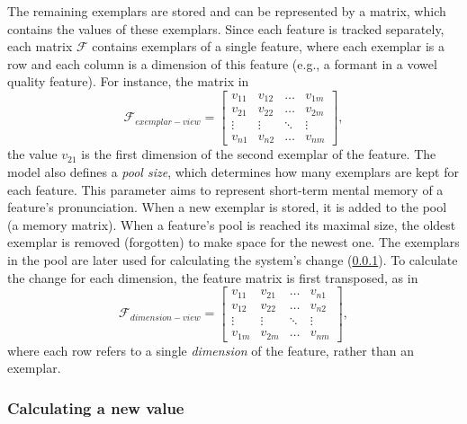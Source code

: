 The remaining exemplars are stored and can be represented by a matrix, which contains the values of these exemplars.
Since each feature is tracked separately, each matrix $\mathcal{F}$ contains exemplars of a single feature, where each exemplar is a row and each column is a dimension of this feature (e.g., a formant in a vowel quality feature).
For instance, the matrix in
%
\begin{equation}
	\label{eq:feature_matrix}
	\mathcal{F}_{exemplar-view} =
	\begin{bmatrix} 
		v_{11} & v_{12} & \dots  & v_{1m}\\
		v_{21} & v_{22} & \dots  & v_{2m}\\
		\vdots & \vdots & \ddots & \vdots\\
		v_{n1} & v_{n2} & \dots  & v_{nm} 
	\end{bmatrix},
\end{equation}
\noindent
%
the value $v_{21}$ is the first dimension of the second exemplar of the feature.
The model also defines a \emph{pool size}, which determines how many exemplars are kept for each feature.
This parameter aims to represent short-term mental memory of a feature's pronunciation.
When a new exemplar is stored, it is added to the pool (a memory matrix).
When a feature's pool is reached its maximal size, the oldest exemplar is removed (forgotten) to make space for the newest one.
The exemplars in the pool are later used for calculating the system's change (\cref{subsubsec:calculating_changed_value}).
To calculate the change for each dimension, the feature matrix is first transposed, as in
%
\begin{equation}
	\label{eq:transposed_feature_matrix}
	\textbf{$\mathcal{F}_{dimension-view}$} =
	\begin{bmatrix} 
		v_{11} & v_{21} & \dots  & v_{n1}\\
		v_{12} & v_{22} & \dots  & v_{n2} \\
		\vdots & \vdots & \ddots & \vdots \\
		v_{1m} & v_{2m} & \dots  & v_{nm} 
	\end{bmatrix},
\end{equation}
\noindent
%
where each row refers to a single \emph{dimension} of the feature, rather than an exemplar.

\subsubsection{Calculating a new value}
\label{subsubsec:calculating_changed_value}

